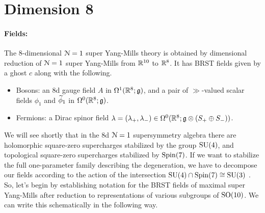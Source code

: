 \documentclass[10pt, oneside]{article}
\begin{document}
%  



\section{Dimension 8}
\vspace{-10pt}
\paragraph{Fields:} 
The 8-dimensional $\mathcal{N}=1$ super Yang-Mills theory is obtained by dimensional reduction of $\mathcal{N}=1$ super Yang-Mills from $\mathbb R^{10}$ to $\mathbb R^8$.  It has BRST fields given by a ghost $c$ along with the following.
\begin{itemize}
 \item Bosons: an 8d gauge field $A$ in $\Omega^1(\mathbb R^8; \mathfrak{g})$, and a pair of $\gg$-valued scalar fields $\phi_1$ and $\widetilde{\phi}_1$ in $\Omega^0(\mathbb R^8; \mathfrak{g})$.
 \item Fermions: a Dirac spinor field $\lambda = (\lambda_+, \lambda_-) \in \Omega^0(\mathbb R^8; \mathfrak{g} \otimes(S_+ \oplus S_-))$.
\end{itemize}

We will see shortly that in the 8d $\mathcal{N}=1$ supersymmetry algebra there are holomorphic square-zero supercharges stabilized by the group $\mathrm{SU}(4)$, and topological square-zero supercharges stabilized by $\mathrm{Spin}(7)$.  If we want to stabilize the full one-parameter family describing the degeneration, we have to decompose our fields according to the action of the intersection $\mathrm{SU}(4) \cap \mathrm{Spin}(7) \cong \mathrm{SU}(3)$ .  So, let's begin by establishing notation for the BRST fields of maximal super Yang-Mills after reduction to representations of various subgroups of $\mathrm{SO}(10)$.  We can write this schematically in the following way.
\end{document}
